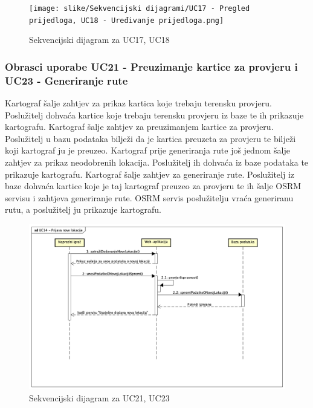 				\begin{figure}[H]
        			\texttt{[image: slike/Sekvencijski dijagrami/UC17 - Pregled prijedloga, UC18 - Uređivanje prijedloga.png]}
        			\centering
        			\caption{Sekvencijski dijagram za UC17, UC18}
        			\label{fig:promjene}
        		\end{figure}
        		
        		\pagebreak
        		\subsubsection{Obrasci uporabe UC21 - Preuzimanje kartice za provjeru i UC23 - Generiranje rute}
        		
        		Kartograf šalje zahtjev za prikaz kartica koje trebaju terensku provjeru. Poslužitelj dohvaća kartice koje trebaju terensku provjeru iz baze te ih prikazuje kartografu. Kartograf šalje zahtjev za preuzimanjem kartice za provjeru. Poslužitelj u bazu podataka bilježi da je kartica preuzeta za provjeru te bilježi koji kartograf ju je preuzeo. Kartograf prije generiranja rute još jednom šalje zahtjev za prikaz neodobrenih lokacija. Poslužitelj ih dohvaća iz baze podataka te prikazuje kartografu. Kartograf šalje zahtjev za generiranje rute. Poslužitelj iz baze dohvaća kartice koje je taj kartograf preuzeo za provjeru te ih šalje OSRM servisu i zahtjeva generiranje rute. OSRM servis poslužitelju vraća generiranu rutu, a poslužitelj ju prikazuje kartografu.
				
				\begin{figure}[H]
        			\includegraphics[scale=0.4]{slike/Sekvencijski dijagrami/UC14 - Prijava nove lokacije.png}
        			\centering
        			\caption{Sekvencijski dijagram za UC21, UC23}
        			\label{fig:promjene}
        		\end{figure}
	    \pagebreak
